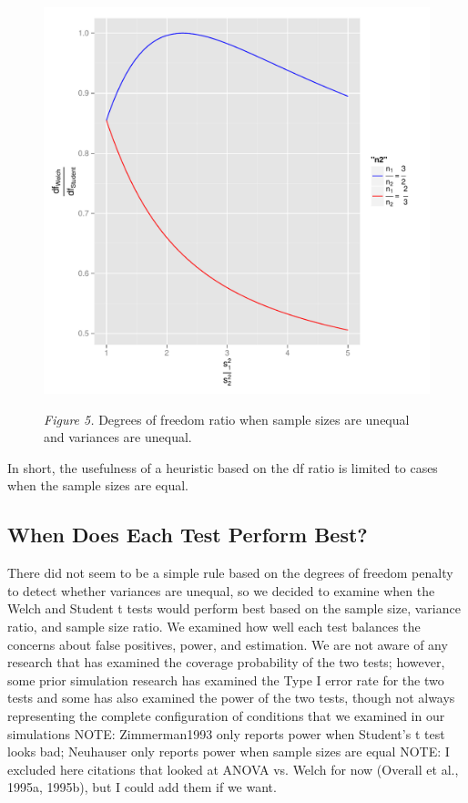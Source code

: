 \documentclass[man,a4paper,noextraspace,apacite]{apa6}\usepackage[]{graphicx}\usepackage[]{color}
\makeatletter
\def\maxwidth{ %
  \ifdim\Gin@nat@width>\linewidth
    \linewidth
  \else
    \Gin@nat@width
  \fi
}
\newenvironment{knitrout}{}{} %
\makeatother
\begin{document}
\begin{figure}
\begin{knitrout}
\color{fgcolor}
\includegraphics[width=\maxwidth]{figure/dfratiosDiffvarsDiffNratios} 

\end{knitrout}
\textit{Figure 5.} Degrees of freedom ratio when sample sizes are unequal and variances are unequal.
\end{figure}
    In short, the usefulness of a heuristic based on the df ratio is limited to cases when the sample sizes are equal. 

\subsection{When Does Each Test Perform Best?}
    There did not seem to be a simple rule based on the degrees of freedom penalty to detect whether variances are unequal, so we decided to examine when the Welch and Student t tests would perform best based on the sample size, variance ratio, and sample size ratio. We examined how well each test balances the concerns about false positives, power, and estimation. We are not aware of any research that has examined the coverage probability of the two tests; however, some prior simulation research has examined the Type I error rate for the two tests \cite{Boneau1960, Zimmerman1993, Zimmerman2004, Zimmerman1996, Zimmerman2009} and some has also examined the power of the two tests, though not always representing the complete configuration of conditions that we examined in our simulations \cite{Neuhauser2002, Zimmerman1993}
    NOTE: Zimmerman1993 only reports power when Student's t test looks bad; Neuhauser only reports power when sample sizes are equal
    NOTE: I excluded here citations that looked at ANOVA vs. Welch for now (Overall et al., 1995a, 1995b), but I could add them if we want.
    
\end{document}
